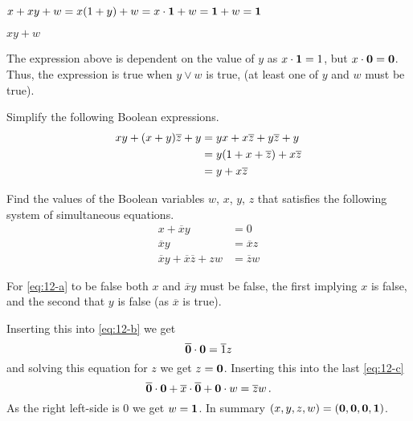 \documentclass[a4paper, english, 12pt]{article} %
\begin{document}
\begin{subproblem}
  $x + xy + w = \ans{x(1+y) + w = x \cdot \1 + w = \1 + w = \1}$
\end{subproblem} 

\begin{subproblem}
  $xy + w$
\end{subproblem} 

\begin{answer}
  The expression above is dependent on the value of $y$ as $x \cdot \textbf{1} = 1$, but
  $x \cdot \textbf{0} = \textbf{0}$. Thus, the expression is true when $y \vee w$ is true,
  (at least one of $y$ and $w$ must be true).
\end{answer}

\begin{problem}[11]
\begin{subproblem}
  Simplify the following Boolean expressions.
  \begin{align*}
    xy + (x + y)\overline{z} + y
    \ans{& = yx + x\overline{z} + y \overline{z} + y \\} 
    \ans{& = y(1 + x + \overline{z}) + x\overline{z} \\}
    \ans{& = y + x \overline{z}}
  \end{align*}
\end{subproblem}
\end{problem}

\begin{problem}
  Find the values of the Boolean variables $w$, $x$, $y$, $z$ that satisfies the
  following system of simultaneous equations.
  \begin{align}
    x + \overline{x} y & = 0 \label{eq:12-a} \\
    \overline{x} y & = \overline{x} z \label{eq:12-b} \\ 
    \overline{x} y + \overline{x} \overline{z} + z w & = \overline{z} w \label{eq:12-c} 
  \end{align}
\end{problem}

\begin{answer}
  For \cref{eq:12-a} to be false both $x$ and $\overline{x}y$ must be false,
  the first implying $x$ is false, and the second that $y$ is false (as
  $\overline{x}$ is true).

  Inserting this into \cref{eq:12-b} we get
  \begin{equation*}
    \overline{\textbf{0}} \cdot \textbf{0} = \overline{1} z
  \end{equation*}
  and solving this equation for $z$ we get $z = \textbf{0}$. Inserting this into the
  last \cref{eq:12-c}
  \begin{equation*}
    \overline{\textbf{0}} \cdot \textbf{0} + \overline{x} \cdot \overline{\textbf{0}} + \textbf{0} \cdot w = \overline{z} w\,.
  \end{equation*}
  As the right left-side is $0$ we get $w = \textbf{1}$. In summary $(x,y,z,w)=(\textbf{0},\textbf{0},\textbf{0},\textbf{1})$.
\end{answer}
\end{document}
